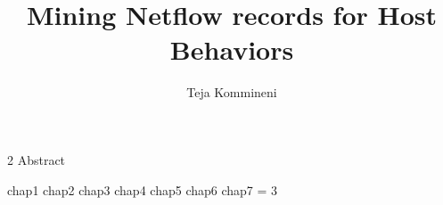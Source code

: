\documentclass[11pt,Chicago]{uuthesis2e}
\author                 {Teja Kommineni}
\title                  {Mining Netflow records for Host Behaviors}
\begin{document}
	
	\frontmatterformat
	\titlepage
	\copyrightpage
	\dissertationapproval
	\setcounter {page}     {2}             %
	 {Abstract}
	
	
	\tableofcontents
	\listoffigures
	\listoftables
	
	
	
	
	
	\maintext       %
	
	\pagestyle{headings} %
	
	 {chap1}
	 {chap2}
	 {chap3}
	 {chap4}
	 {chap5}
	 {chap6}
	 {chap7}
	\numberofappendices = 3
	\appendix       %
	
	
\end{document}
